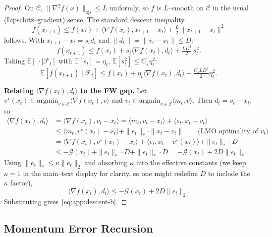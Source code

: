 \documentclass{article}
\theoremstyle{plain}
\theoremstyle{definition}
\theoremstyle{remark}
\begin{document}
\begin{proof}
On $\mathcal{C}$, $\|\nabla^2 f(x)\|_{\mathrm{op}} \leq L$ uniformly, so
$f$ is $L$--smooth on $\mathcal{C}$ in the usual (Lipschitz--gradient)
sense. The standard descent inequality
\[
  f(x_{t+1}) \leq f(x_t) + \langle \nabla f(x_t), x_{t+1} - x_t\rangle
    + \tfrac{L}{2}\|x_{t+1} - x_t\|^2
\]
follows. With $x_{t+1} - x_t = s_t d_t$ and $\|d_t\| = \|v_t - x_t\|
\leq D$:
\[
  f(x_{t+1}) \leq f(x_t) + s_t\langle\nabla f(x_t), d_t\rangle
    + \tfrac{L D^2}{2}\, s_t^2.
\]
Taking $\mathbb{E}[\,\cdot \mid \mathcal{F}_t]$ with $\mathbb{E}[s_t] =
\eta_t$, $\mathbb{E}[s_t^2] \leq C_s\eta_t^2$:
\[
  \mathbb{E}[f(x_{t+1}) \mid \mathcal{F}_t]
  \leq f(x_t) + \eta_t\langle\nabla f(x_t), d_t\rangle
    + \tfrac{C_s L D^2}{2}\eta_t^2.
\]

\smallskip\noindent\textbf{Relating $\langle\nabla f(x_t), d_t\rangle$ to the FW gap.}
Let $v^\star(x_t) \in \mathrm{argmin}_{v \in \mathcal{C}}\langle\nabla
f(x_t), v\rangle$ and $v_t \in \mathrm{argmin}_{v \in
\mathcal{C}}\langle m_t, v\rangle$. Then $d_t = v_t - x_t$, so
\begin{align*}
  \langle\nabla f(x_t), d_t\rangle
  &= \langle\nabla f(x_t), v_t - x_t\rangle
  = \langle m_t, v_t - x_t\rangle + \langle e_t, x_t - v_t\rangle
  \\
  &\leq \langle m_t, v^\star(x_t) - x_t\rangle + \|e_t\|_*\cdot \|x_t - v_t\|
  \qquad \text{(LMO optimality of } v_t\text{)}
  \\
  &= \langle\nabla f(x_t), v^\star(x_t) - x_t\rangle
    + \langle e_t, x_t - v^\star(x_t)\rangle + \|e_t\|_*\cdot D
  \\
  &\leq -\mathcal{G}(x_t) + \|e_t\|_*\cdot D + \|e_t\|_*\cdot D
  = -\mathcal{G}(x_t) + 2D\|e_t\|_*.
\end{align*}
Using $\|e_t\|_* \leq \kappa\|e_t\|_2$ and absorbing $\kappa$ into the
effective constants (we keep $\kappa = 1$ in the main--text display for
clarity, so one might redefine $D$ to include the $\kappa$ factor),
\[
  \langle\nabla f(x_t), d_t\rangle \leq -\mathcal{G}(x_t) + 2D\|e_t\|_2.
\]
Substituting gives~\eqref{eq:app:descent-b}.
\end{proof}


\subsection{Momentum Error Recursion}
\label{app:error-recursion}
\end{document}
